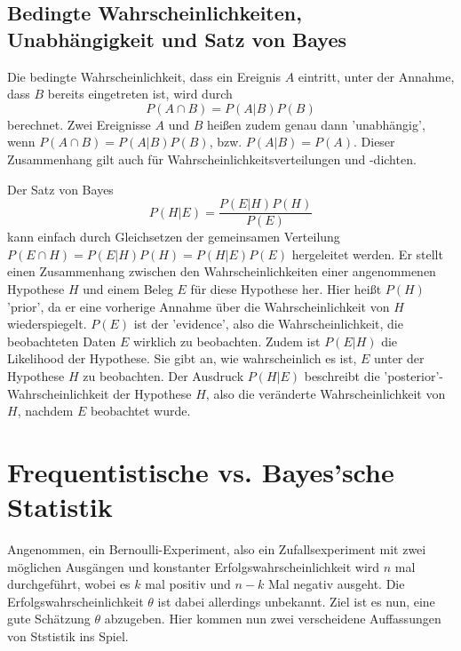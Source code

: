 \documentclass{article}
\begin{document}
\subsection{Bedingte Wahrscheinlichkeiten, Unabhängigkeit und Satz von Bayes}
Die bedingte Wahrscheinlichkeit, dass ein Ereignis \(A\) eintritt, unter der Annahme, dass \(B\) bereits eingetreten ist, wird durch\[
P(A\cap B)=P(A|B)P(B)
\]berechnet. Zwei Ereignisse \(A\) und \(B\) heißen zudem genau dann 'unabhängig', wenn \(P(A\cap B)=P(A|B)P(B)\), bzw. \(P(A|B)=P(A)\). Dieser Zusammenhang gilt auch für Wahrscheinlichkeitsverteilungen und -dichten.

Der Satz von Bayes\[
P(H|E)=\frac{P(E|H)P(H)}{P(E)}
\]kann einfach durch Gleichsetzen der gemeinsamen Verteilung \(P(E\cap H)=P(E|H)P(H)=P(H|E)P(E)\) hergeleitet werden. Er stellt einen Zusammenhang zwischen den Wahrscheinlichkeiten einer angenommenen Hypothese \(H\) und einem Beleg \(E\) für diese Hypothese her. Hier heißt \(P(H)\) 'prior', da er eine vorherige Annahme über die Wahrscheinlichkeit von \(H\) wiederspiegelt. \(P(E)\) ist der 'evidence', also die Wahrscheinlichkeit, die beobachteten Daten \(E\) wirklich zu beobachten. Zudem ist \(P(E|H)\) die Likelihood der Hypothese. Sie gibt an, wie wahrscheinlich es ist, \(E\) unter der Hypothese \(H\) zu beobachten. Der Ausdruck \(P(H|E)\) beschreibt die 'posterior'-Wahrscheinlichkeit der Hypothese \(H\), also die veränderte Wahrscheinlichkeit von \(H\), nachdem \(E\) beobachtet wurde.

\section{Frequentistische vs. Bayes'sche Statistik}

Angenommen, ein Bernoulli-Experiment, also ein Zufallsexperiment mit zwei möglichen Ausgängen und konstanter Erfolgswahrscheinlichkeit wird \(n\) mal durchgeführt, wobei es \(k\) mal positiv und \(n-k\) Mal negativ ausgeht. Die Erfolgswahrscheinlichkeit \(\theta\) ist dabei allerdings unbekannt. Ziel ist es nun, eine gute Schätzung \(\theta\) abzugeben. Hier kommen nun zwei verscheidene Auffassungen von Ststistik ins Spiel.
\end{document}
